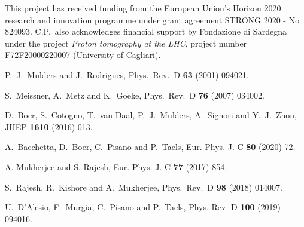 \documentclass[prd,aps,preprintnumbers,nofootinbib,superscriptaddress]{revtex4}
\begin{document}
\acknowledgments
This project has received funding from the European Union's Horizon 2020 research and innovation programme under grant agreement STRONG 2020 - No 824093.
C.P.\  also acknowledges financial support by Fondazione di Sardegna under the project {\em Proton tomography at the LHC}, project number F72F20000220007 (University of Cagliari). 
\begin{thebibliography}{99}

  P.~J.~Mulders and J.~Rodrigues,
  Phys.\ Rev.\  D {\bf 63}  (2001) 094021.

  S.~Meissner, A.~Metz and K.~Goeke,
  Phys.\ Rev.\ D {\bf 76} (2007) 034002.

  D.~Boer, S.~Cotogno, T.~van Daal, P.~J.~Mulders, A.~Signori and Y.~J.~Zhou,
  JHEP {\bf 1610} (2016) 013.

A.~Bacchetta, D.~Boer, C.~Pisano and P.~Taels,
Eur. Phys. J. C \textbf{80} (2020)  72.

A. Mukherjee and S. Rajesh,  Eur. Phys. J. C \textbf{77} (2017) 854.

  S.~Rajesh, R.~Kishore and A.~Mukherjee,
  Phys.\ Rev.\ D {\bf 98} (2018) 014007.

U.~D'Alesio, F.~Murgia, C.~Pisano and P.~Taels,
Phys. Rev. D \textbf{100} (2019) 094016.


\end{thebibliography}
\end{document}

